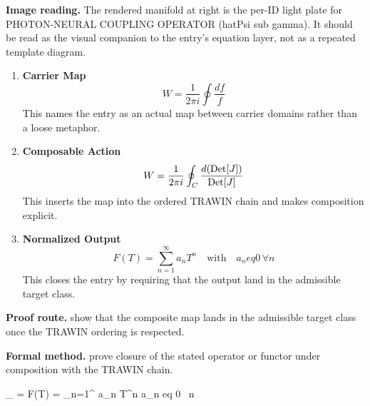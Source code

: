 \begin{samepage}
\noindent\begin{minipage}[t]{0.45\linewidth}
\vspace{0pt}
\raggedright
\scriptsize\textbf{Image reading.} The rendered manifold at right is the per-ID light plate for PHOTON-NEURAL COUPLING OPERATOR (hatPsi sub gamma). It should be read as the visual companion to the entry's equation layer, not as a repeated template diagram.\par
\end{minipage}\hfill
\begin{minipage}[t]{0.53\linewidth}
\vspace*{-0.10in}
\raggedright
{}
\end{minipage}
\end{samepage}

\clearpage


\begin{enumerate}[leftmargin=1.6em,itemsep=9pt,topsep=6pt]
\item \textbf{Carrier Map}
\[
W = \frac{1}{2\pi i} \oint \frac{df}{f}
\]
This names the entry as an actual map between carrier domains rather than a loose metaphor.

\item \textbf{Composable Action}
\[
W = \frac{1}{2\pi i} \oint_C \frac{d({\rm Det}[J])}{{\rm Det}[J]}
\]
This inserts the map into the ordered TRAWIN chain and makes composition explicit.

\item \textbf{Normalized Output}
\[
F(T) = \sum_{n=1}^{\infty} a_n T^n \quad \text{with} \quad a_n  eq 0 \, \forall n
\]
This closes the entry by requiring that the output land in the admissible target class.
\end{enumerate}

\textbf{Proof route.} show that the composite map lands in the admissible target class once the TRAWIN ordering is respected.

\textbf{Formal method.} prove closure of the stated operator or functor under composition with the TRAWIN chain.

\medskip
{}

\begin{tzpsnapshot}
\end{tzpsnapshot}

\tzpequationlinks
  { \to {}}
  {_{} = \cdots}
  {F(T) = \sum_{n=1}^{\infty} a_n T^n \quad {} \quad a_n  eq 0 \, \forall n}
